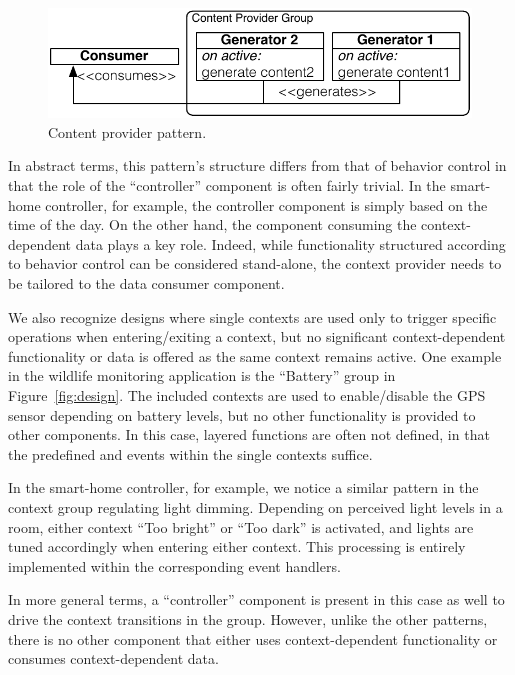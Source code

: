 \begin{figure}
\begin{center}
\includegraphics[scale=.43]{imgs/content_provider}
\vspace{-1mm}
\caption{Content provider pattern.}
  \label{fig:provider}
\vspace{-8mm}
\end{center}
\end{figure}

In abstract terms, this pattern's structure differs from that of
behavior control in that the role of the ``controller'' component is
often fairly trivial. In the smart-home controller, for example, the
controller component is simply based on the time of the day. On the
other hand, the component consuming the context-dependent data plays a
key role. Indeed, while functionality structured according to behavior
control can be considered stand-alone, the context provider needs to
be tailored to the data consumer component.

 We also recognize designs where single contexts are
used only to trigger specific operations when entering/exiting a
context, but no significant context-dependent functionality or data is
offered as the same context remains active. One example in the wildlife
monitoring application is the ``Battery'' group in
Figure~\ref{fig:design}. The included contexts are used to
enable/disable the GPS sensor depending on battery levels, but no
other functionality is provided to other components. In this
case, layered functions are often not defined, in
that the predefined  and  events
within the single contexts suffice.

In the smart-home controller, for example, we notice a similar pattern
in the context group regulating light dimming. Depending on
perceived light levels in a room, either context ``Too bright'' or
``Too dark'' is activated, and lights are tuned accordingly when
entering either context. This processing is entirely implemented
within the corresponding  event handlers. 

In more general terms, a ``controller'' component is present in this
case as well to drive the context transitions in the group. However,
unlike the other patterns, there is no other component that either
uses context-dependent functionality or consumes context-dependent
data.

